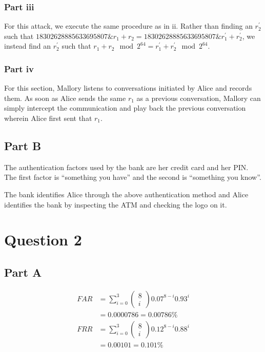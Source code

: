\documentclass[12pt]{article}
\begin{document}
\subsubsection*{Part iii}
For this attack, we execute the same procedure as in ii. Rather than finding an $r_2^\prime$ such that $18302628885633695807 \& r_1 + r_2 = 18302628885633695807 \& r_1^\prime + r_2^\prime$, we instead find an $r_2^\prime$ such that $r_1 + r_2 \mod{2^{64}} = r_1^\prime + r_2^\prime \mod{2^{64}}$.

\subsubsection*{Part iv}
For this section, Mallory listens to conversations initiated by Alice and records them. As soon as Alice sends the same $r_1$ as a previous conversation, Mallory can simply intercept the communication and play back the previous conversation wherein Alice first sent that $r_1$.

\subsection*{Part B}
The authentication factors used by the bank are her credit card and her PIN. The first factor is ``something you have'' and the second is ``something you know''.

The bank identifies Alice through the above authentication method and Alice identifies the bank by inspecting the ATM and checking the logo on it.

\section*{Question 2}
\subsection*{Part A}
\begin{align*}
FAR &= \sum_{i=0}^3 \begin{pmatrix}8 \\i\end{pmatrix} 0.07^{8-i} 0.93^i \\
    &= 0.0000786 = 0.00786\% \\
FRR &= \sum_{i=0}^3 \begin{pmatrix}8 \\i\end{pmatrix} 0.12^{8-i} 0.88^i \\
    &= 0.00101 = 0.101\% \\
\end{align*}
\end{document}
